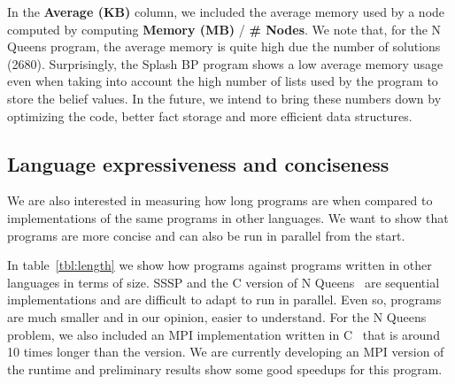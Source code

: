 In the \textbf{Average (KB)} column, we included the average memory used by a node computed by computing \textbf{Memory (MB)} / \textbf{\# Nodes}.
We note that, for the N Queens program, the average memory is quite high due the number of solutions (2680).
Surprisingly, the Splash BP program shows a low average memory usage even when taking into account the high number of lists used by the program
to store the belief values. In the future, we intend to bring these numbers down by optimizing the code, better fact storage and more efficient
data structures.

\subsection{Language expressiveness and conciseness}

We are also interested in measuring how long \lang programs are when compared to implementations of the same programs in other languages.
We want to show that \lang programs are more concise and can also be run in parallel from the start.

In table~\ref{tbl:length} we show how \lang programs against programs written in other languages in
terms of size. SSSP and the C version of N Queens~\cite{8queens-parallel} are sequential implementations and are difficult
to adapt to run in parallel. Even so, \lang programs are much smaller and in our opinion, easier
to understand. For the N Queens problem, we also included an MPI implementation written in C~\cite{Rolfe:2008:SMA:1473195.1473217}
that is around 10 times longer than the \lang version. We are currently developing an MPI version
of the \lang runtime and preliminary results show some good speedups for this program.

\begin{table}[ht]
\begin{center}
\end{center}
     \caption{Comparison of source code size against other languages.}
     \label{tbl:length}
\end{table}

